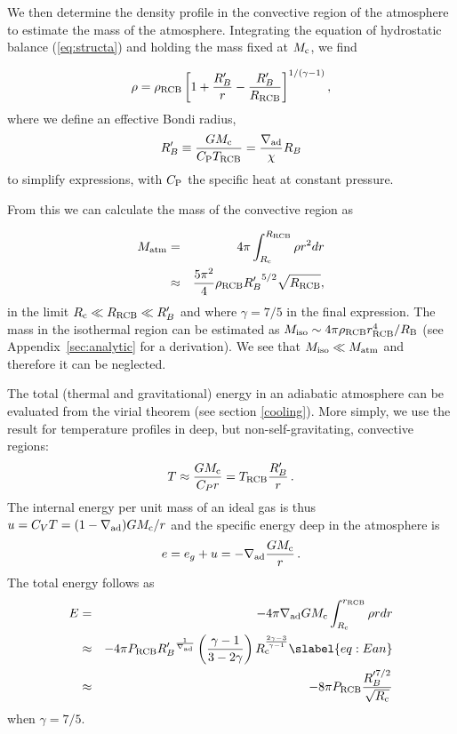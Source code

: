 \documentclass[apj]{emulateapj}
\newcommand{\delad}{\nabla_{\rm ad}}
\newcommand{\App}[1]{Appendix~\ref{#1}}
\newcommand{\Rg}{\mathcal{R}}
\newcommand{\co}{_{\rm c}}
\newcommand{\di}{_{\rm d}}
\newcommand{\cb}{_{\rm RCB}}
\begin{document}
We then determine the density profile in the convective region of the atmosphere to estimate the mass of the atmosphere. Integrating the equation of hydrostatic balance (\ref{eq:structa}) and holding the mass fixed at $M\co$, we find

\begin{equation}\label{eq:rhoconv} 
\rho = \rho\cb \left[ 1 + {R_B' \over r} - {R_B' \over R\cb}  \right]^{1/(\gamma -1)},
\end{equation} 
where we define an effective Bondi radius,
\begin{equation}
R_B' \equiv {G M\co \over C_{\rm P} T\cb} = {\delad \over \chi} R_B
\end{equation} 
to simplify expressions, with $C_{\rm P}$ the specific heat at constant pressure.

From this we can calculate the mass of the convective region as

\begin{eqnarray} 
\label{eq:Matman}
M_{\rm atm} &=& 4 \pi \int_{R\co}^{R\cb} \rho r^2 dr \\
&\approx& {5 \pi^2 \over 4} \rho\cb {R_B'}^{5/2} \sqrt{R\cb}, %
\end{eqnarray}
in the limit $R\co \ll R\cb \ll R_B'$ and where $\gamma=7/5$ in the final expression. The mass in the isothermal region can be estimated as $M_{\rm iso} \sim 4 \pi \rho\cb r\cb^4/R_{\rm B}$ (see \App{sec:analytic} for a derivation).  We see that $M_{\rm{iso}} \ll M_{\rm{atm}}$ and therefore it can be neglected.


The total (thermal and gravitational) energy in an adiabatic atmosphere can be evaluated from the virial theorem (see section \ref{cooling}).  More simply, we use the result for temperature profiles in deep, but non-self-gravitating, convective regions:
\begin{equation}
T \approx {G M\co \over C_P r} = T\cb {R_B' \over r}\, .
\end{equation} 
The internal energy per unit mass of an ideal gas is thus $u = C_V T = (1 - \delad) G M\co/r$ and the specific energy  deep in the atmosphere is
\begin{equation}
e = e_g + u = -\delad {GM\co \over r} \, .
\end{equation} 
The total energy follows as
\begin{eqnarray} 
E &=& - 4 \pi \nabla_{\rm ad} G M\co \int_{R\co}^{r\cb} \rho r dr \\
&\approx& - 4 \pi P\cb {R_B'}^{1 \over \nabla_{\rm ad}} \left(\gamma-1 \over 3 - 2 \gamma\right)  R\co^{2\gamma-3\over \gamma-1}  \slabel{eq:Ean} \\ 
&\approx& - 8 \pi P\cb {R_B'^{7/2} \over \sqrt{R\co}}
\end{eqnarray} 
when $\gamma = 7/5$. %
\end{document}
